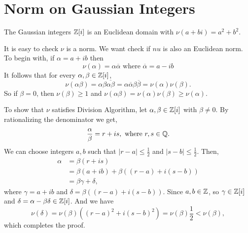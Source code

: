 \section{Norm on Gaussian Integers}
\begin{eg}
    The Gaussian integers $\mathbb{Z}[i]$ is an Euclidean domain with $\nu(a + bi) = a^2 + b^2$.
\end{eg}
\begin{explanation}
    It is easy to check $\nu$ is a norm. We want check if $nu$ is also an Euclidean norm.\\
    To begin with, if $\alpha = a + ib$ then \[\nu(\alpha) = \alpha \overline{\alpha} \text{ where } \overline{\alpha} = a - ib\]
    It follows that for every $\alpha, \beta \in \mathbb{Z}[i]$,
    \[\nu(\alpha\beta) = \alpha\beta\overline{\alpha\beta} = \alpha\overline{\alpha}\beta\overline{\beta} = \nu(\alpha)\nu(\beta).\]
    So if $\beta = 0$, then $\nu(\beta) \ge 1$ and $\nu(\alpha\beta) = \nu(\alpha)\nu(\beta) \ge \nu(\alpha)$.

    To show that $\nu$ satisfies Division Algorithm, let $\alpha, \beta \in \mathbb{Z}[i]$ with $\beta \neq 0$. By rationalizing the denominator we get, \[\frac{\alpha}{\beta} = r + is, \text{ where } r, s \in \mathbb{Q}.\]
    We can choose integers $a, b$ such that $|r -a| \le \frac{1}{2}$ and $|s - b| \le \frac{1}{2}$. Then,
    \begin{align*}
        \alpha &= \beta(r + is)\\
               &= \beta(a + ib) + \beta((r-a) + i(s-b))\\
               &= \beta \gamma + \delta,
    \end{align*}
    where $\gamma = a + ib$ and $\delta = \beta((r-a) + i(s-b))$. Since $a,b \in \mathbb{Z}$, so $\gamma \in \mathbb{Z}[i]$ and $\delta = \alpha - \beta\delta \in \mathbb{Z}[i]$. And we have
    \[\nu(\delta) = \nu(\beta)((r-a)^2 + i(s-b)^2) = \nu(\beta)\frac{1}{2} < \nu(\beta),\]
    which completes the proof.
\end{explanation}

